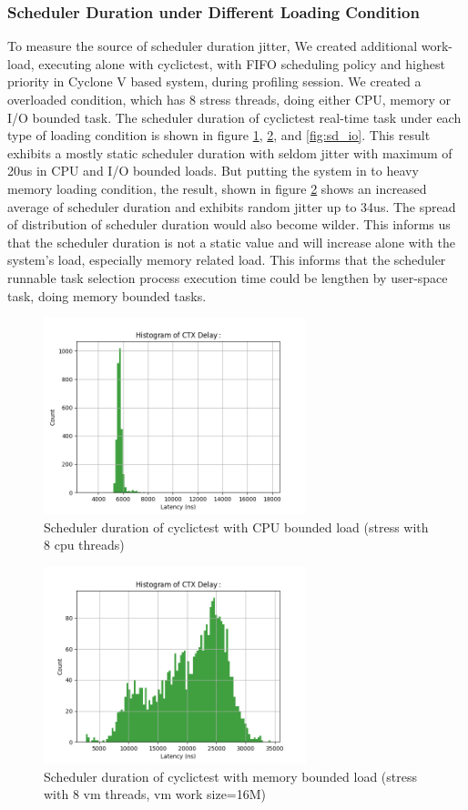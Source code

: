 \documentclass[conference]{IEEEtran}
\begin{document}
\subsubsection{Scheduler Duration under Different Loading Condition}

    To measure the source of scheduler duration jitter, We created additional work-load, executing alone with
    cyclictest, with FIFO scheduling policy and highest priority in Cyclone V based system, during profiling session. We
    created a overloaded condition, which has 8 stress threads, doing either CPU, memory or I/O bounded task. The
    scheduler duration of cyclictest real-time task under each type of loading condition is shown in figure
    \ref{fig:sd_cpu}, \ref{fig:sd_memory}, and \ref{fig:sd_io}. This result exhibits a mostly static scheduler
    duration with seldom jitter with maximum of 20us in CPU and I/O bounded loads. But putting the system in to heavy
    memory loading condition, the result, shown in figure \ref{fig:sd_memory} shows an increased average of scheduler
    duration and exhibits random jitter up to 34us. The spread of distribution of scheduler duration would also become
    wilder. This informs us that the scheduler duration is not a static value and will increase alone with the system's
    load, especially memory related load. This informs that the scheduler runnable task selection process execution time
    could be lengthen by user-space task, doing memory bounded tasks.

    \begin{figure} \centering \includegraphics[width=3in]{img/sd-cpu.png} \caption{Scheduler duration of cyclictest
    with CPU bounded load (stress with 8 cpu threads)} \label{fig:sd_cpu} \end{figure}

    \begin{figure} \centering \includegraphics[width=3in]{img/sd-memory.png} \caption{Scheduler duration of cyclictest
    with memory bounded load (stress with 8 vm threads, vm work size=16M)} \label{fig:sd_memory} \end{figure}
\end{document}
